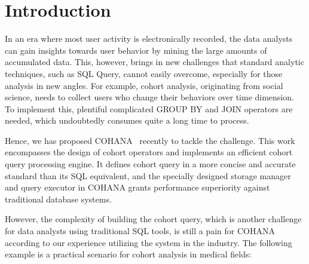 \section{Introduction}
\label{sec::intro}
%
In an era where most user activity is electronically recorded, the data analysts can gain insights towards user behavior by mining the large amounts of accumulated data.
This, however, brings in new challenges that standard analytic techniques, such as SQL Query, cannot easily overcome, especially for those analysis in new angles. 
For example, cohort analysis, originating from social science\cite{glenn2005cohort}, needs to collect users who change their behaviors over time dimension.
To implement this, plentiful complicated GROUP BY and JOIN operators are needed, which undoubtedly consumes quite a long time to process.

Hence, we has proposed COHANA~\cite{jiang2016cohort} recently to tackle the challenge.
This work encompasses the design of cohort operators and implements an efficient cohort query processing engine. It defines cohort query in a more concise and accurate standard than its SQL equivalent, and the specially designed storage manager and query executor in COHANA grants performance superiority against traditional database systems. 

However, the complexity of building the cohort query, which is another challenge for data analysts using traditional SQL tools, is still a pain for COHANA according to our experience utilizing the system in the industry.
The following example is a practical scenario for cohort analysis in medical fields:



